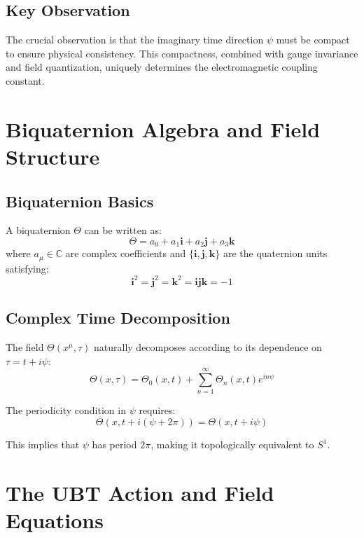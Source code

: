 \documentclass[12pt, a4paper]{article}
\theoremstyle{definition}
\theoremstyle{remark}
\begin{document}
\subsection{Key Observation}

The crucial observation is that the imaginary time direction $\psi$ must be compact to ensure physical consistency. This compactness, combined with gauge invariance and field quantization, uniquely determines the electromagnetic coupling constant.

\section{Biquaternion Algebra and Field Structure}

\subsection{Biquaternion Basics}

A biquaternion $\Theta$ can be written as:
\begin{equation}
\Theta = a_0 + a_1 \mathbf{i} + a_2 \mathbf{j} + a_3 \mathbf{k}
\end{equation}
where $a_\mu \in \mathbb{C}$ are complex coefficients and $\{\mathbf{i}, \mathbf{j}, \mathbf{k}\}$ are the quaternion units satisfying:
\begin{equation}
\mathbf{i}^2 = \mathbf{j}^2 = \mathbf{k}^2 = \mathbf{i}\mathbf{j}\mathbf{k} = -1
\end{equation}

\subsection{Complex Time Decomposition}

The field $\Theta(x^\mu, \tau)$ naturally decomposes according to its dependence on $\tau = t + i\psi$:
\begin{equation}
\Theta(x, \tau) = \Theta_0(x,t) + \sum_{n=1}^{\infty} \Theta_n(x,t) e^{in\psi}
\end{equation}

The periodicity condition in $\psi$ requires:
\begin{equation}
\Theta(x, t + i(\psi + 2\pi)) = \Theta(x, t + i\psi)
\end{equation}

This implies that $\psi$ has period $2\pi$, making it topologically equivalent to $S^1$.

\section{The UBT Action and Field Equations}
\end{document}
